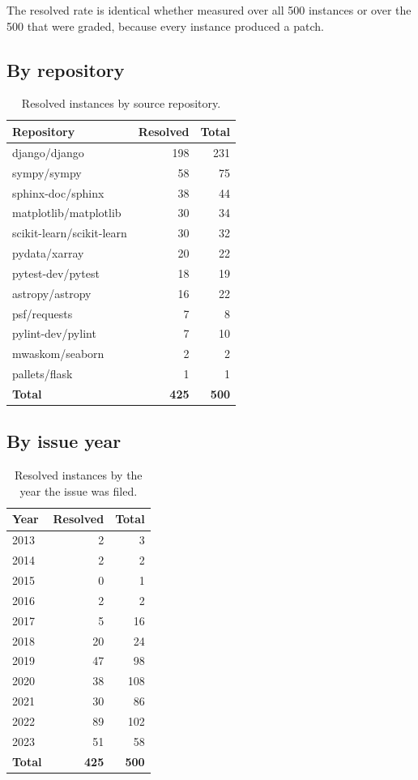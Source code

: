 \documentclass[11pt,a4paper]{article}
\begin{document}
The resolved rate is identical whether measured over all 500 instances or over the 500
that were graded, because every instance produced a patch.

\subsection{By repository}

\begin{table}[H]
\centering
\caption{Resolved instances by source repository.}
\label{tab:byrepo}
\begin{tabular}{@{}lrr@{}}
\toprule
Repository & Resolved & Total \\
\midrule
django/django & 198 & 231 \\
sympy/sympy & 58 & 75 \\
sphinx-doc/sphinx & 38 & 44 \\
matplotlib/matplotlib & 30 & 34 \\
scikit-learn/scikit-learn & 30 & 32 \\
pydata/xarray & 20 & 22 \\
pytest-dev/pytest & 18 & 19 \\
astropy/astropy & 16 & 22 \\
psf/requests & 7 & 8 \\
pylint-dev/pylint & 7 & 10 \\
mwaskom/seaborn & 2 & 2 \\
pallets/flask & 1 & 1 \\
\midrule
\textbf{Total} & \textbf{425} & \textbf{500} \\
\bottomrule
\end{tabular}
\end{table}

\subsection{By issue year}

\begin{table}[H]
\centering
\caption{Resolved instances by the year the issue was filed.}
\label{tab:byyear}
\begin{tabular}{@{}lrr@{}}
\toprule
Year & Resolved & Total \\
\midrule
2013 & 2 & 3 \\
2014 & 2 & 2 \\
2015 & 0 & 1 \\
2016 & 2 & 2 \\
2017 & 5 & 16 \\
2018 & 20 & 24 \\
2019 & 47 & 98 \\
2020 & 38 & 108 \\
2021 & 30 & 86 \\
2022 & 89 & 102 \\
2023 & 51 & 58 \\
\midrule
\textbf{Total} & \textbf{425} & \textbf{500} \\
\bottomrule
\end{tabular}
\end{table}
\end{document}
